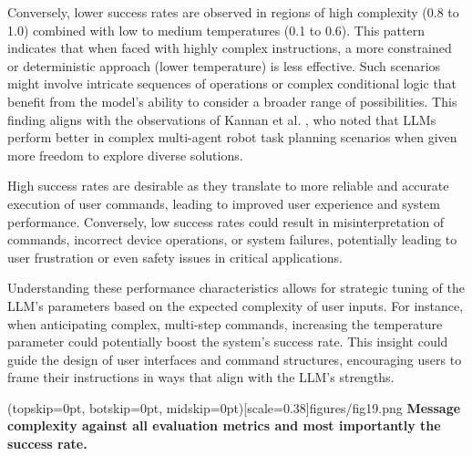 \documentclass{ieeeaccess}
\begin{document}
Conversely, lower success rates are observed in regions of high complexity (0.8 to 1.0) combined with low to medium temperatures (0.1 to 0.6). This pattern indicates that when faced with highly complex instructions, a more constrained or deterministic approach (lower temperature) is less effective. Such scenarios might involve intricate sequences of operations or complex conditional logic that benefit from the model's ability to consider a broader range of possibilities. This finding aligns with the observations of Kannan et al. \cite{kannan2024smartllmsmartmultiagentrobot}, who noted that LLMs perform better in complex multi-agent robot task planning scenarios when given more freedom to explore diverse solutions. 

High success rates are desirable as they translate to more reliable and accurate execution of user commands, leading to improved user experience and system performance. Conversely, low success rates could result in misinterpretation of commands, incorrect device operations, or system failures, potentially leading to user frustration or even safety issues in critical applications. 

Understanding these performance characteristics allows for strategic tuning of the LLM's parameters based on the expected complexity of user inputs. For instance, when anticipating complex, multi-step commands, increasing the temperature parameter could potentially boost the system's success rate. This insight could guide the design of user interfaces and command structures, encouraging users to frame their instructions in ways that align with the LLM's strengths.






\Figure[t!](topskip=0pt, botskip=0pt,
midskip=0pt)[scale=0.38]{{figures/fig19.png}}
{ \textbf{Message complexity against all evaluation metrics and most importantly the success rate.}\label{fig11}}
\end{document}
